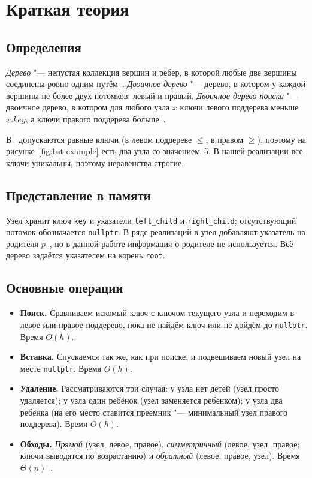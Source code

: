 \documentclass[otchet]{SCWorks}
\begin{document}
\section{Краткая теория}

\subsection{Определения}
 
\emph{Дерево} "--- непустая коллекция вершин и рёбер, в которой любые две
вершины соединены ровно одним путём~\cite{sedgewick}. \emph{Двоичное
дерево} "--- дерево, в котором у каждой вершины не более двух потомков:
левый и правый. \emph{Двоичное дерево поиска} "--- двоичное дерево, в котором
для любого узла $x$ ключи левого поддерева меньше $x.\mathit{key}$, а ключи
правого поддерева больше~\cite{itmo}.
 
В~\cite{kormen} допускаются равные ключи (в левом поддереве $\le$, в правом
$\ge$), поэтому на рисунке~\ref{fig:bst-example} есть два узла со значением~5.
В нашей реализации все ключи уникальны, поэтому неравенства строгие.
 
\subsection{Представление в памяти}
 
Узел хранит ключ \texttt{key} и указатели \texttt{left\_child} и
\texttt{right\_child}; отсутствующий потомок обозначается
\texttt{nullptr}. В ряде реализаций в узел добавляют указатель на родителя
$p$~\cite{kormen}, но в данной работе информация о родителе не используется.
Всё дерево задаётся указателем на корень \texttt{root}.
 
\subsection{Основные операции}
 
\begin{itemize}
  \item \textbf{Поиск.} Сравниваем искомый ключ с ключом текущего узла и
        переходим в левое или правое поддерево, пока не найдём ключ или не
        дойдём до \texttt{nullptr}. Время $O(h)$.
  \item \textbf{Вставка.} Спускаемся так же, как при поиске, и подвешиваем
        новый узел на месте \texttt{nullptr}. Время $O(h)$.
  \item \textbf{Удаление.} Рассматриваются три случая: у узла нет детей
        (узел просто удаляется); у узла один ребёнок (узел заменяется
        ребёнком); у узла два ребёнка (на его место ставится преемник "---
        минимальный узел правого поддерева). Время $O(h)$.
  \item \textbf{Обходы.} \emph{Прямой} (узел, левое, правое),
        \emph{симметричный} (левое, узел, правое; ключи выводятся по
        возрастанию) и \emph{обратный} (левое, правое, узел). Время
        $\Theta(n)$~\cite{kormen}.
\end{itemize}
 
\end{document}
